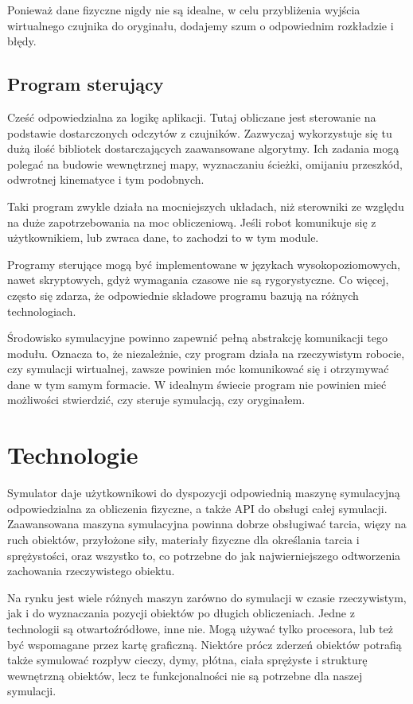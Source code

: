 Ponieważ dane fizyczne nigdy nie są idealne, w celu przybliżenia wyjścia wirtualnego czujnika do oryginału, dodajemy szum o odpowiednim rozkładzie i błędy.

\subsection{Program sterujący}
Cześć odpowiedzialna za logikę aplikacji. Tutaj obliczane jest sterowanie na podstawie dostarczonych odczytów z czujników.
Zazwyczaj wykorzystuje się tu dużą ilość bibliotek dostarczających zaawansowane algorytmy.
Ich zadania mogą polegać na budowie wewnętrznej mapy, wyznaczaniu ścieżki, omijaniu przeszkód, odwrotnej kinematyce i tym podobnych.

Taki program zwykle działa na mocniejszych układach, niż sterowniki ze względu na duże zapotrzebowania na moc obliczeniową.
Jeśli robot komunikuje się z użytkownikiem, lub zwraca dane, to zachodzi to w tym module. 

Programy sterujące mogą być implementowane w językach wysokopoziomowych, nawet skryptowych, gdyż wymagania czasowe nie są rygorystyczne.
Co więcej, często się zdarza, że odpowiednie składowe programu bazują na różnych technologiach.

Środowisko symulacyjne powinno zapewnić pełną abstrakcję komunikacji tego modułu.
Oznacza to, że niezależnie, czy program działa na rzeczywistym robocie, czy symulacji wirtualnej, zawsze powinien móc komunikować się i otrzymywać dane w tym samym formacie.
W idealnym świecie program nie powinien mieć możliwości stwierdzić, czy steruje symulacją, czy oryginałem.

\section{Technologie}
Symulator daje użytkownikowi do dyspozycji odpowiednią maszynę symulacyjną odpowiedzialna za obliczenia fizyczne, a także API do obsługi całej symulacji.
Zaawansowana maszyna symulacyjna powinna dobrze obsługiwać tarcia, więzy na ruch obiektów, przyłożone siły, materiały fizyczne dla określania tarcia i sprężystości, 
oraz wszystko to, co potrzebne do jak najwierniejszego odtworzenia zachowania rzeczywistego obiektu.

Na rynku jest wiele różnych maszyn zarówno do symulacji w czasie rzeczywistym, jak i do wyznaczania pozycji obiektów po długich obliczeniach.
Jedne z technologii są otwartoźródłowe, inne nie. Mogą używać tylko procesora, lub też być wspomagane przez kartę graficzną.
Niektóre prócz zderzeń obiektów potrafią także symulować rozpływ cieczy, dymy, płótna, ciała sprężyste i strukturę wewnętrzną obiektów, lecz te funkcjonalności nie są potrzebne dla naszej symulacji.

